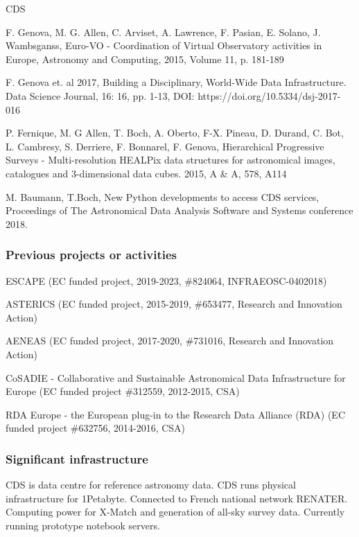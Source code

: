 \begin{sitedescription}{CDS}
\begin{compactenum}
  \item F. Genova, M. G. Allen, C. Arviset, A. Lawrence, F. Pasian, E. Solano, J. Wambsganss, Euro-VO - Coordination of Virtual Observatory activities in Europe, Astronomy and Computing, 2015, Volume 11, p. 181-189
  \item F. Genova et. al 2017, Building a Disciplinary, World-Wide Data Infrastructure. Data Science Journal, 16: 16, pp. 1-13, DOI: https://doi.org/10.5334/dsj-2017-016
  \item P. Fernique, M. G Allen, T. Boch, A. Oberto, F-X. Pineau, D. Durand, C. Bot, L. Cambresy, S. Derriere, F. Bonnarel, F. Genova, Hierarchical Progressive Surveys - Multi-resolution HEALPix data structures for astronomical images, catalogues and 3-dimensional data cubes.  2015, A \& A, 578, A114 
  \item M. Baumann, T.Boch, New Python developments to access CDS services, Proceedings of The Astronomical Data Analysis Software and Systems conference 2018.
\end{compactenum}

\subsubsection*{Previous projects or activities}

\begin{compactenum}
  \item ESCAPE (EC funded project, 2019-2023, \#824064, INFRAEOSC-0402018)
  \item ASTERICS (EC funded project, 2015-2019, \#653477, Research and Innovation Action)
  \item AENEAS (EC funded project,  2017-2020, \#731016, Research and Innovation Action)
  \item CoSADIE - Collaborative and Sustainable Astronomical Data Infrastructure for Europe (EC funded project \#312559, 2012-2015, CSA)
  \item RDA Europe - the European plug-in to the Research Data Alliance (RDA) (EC funded project \#632756, 2014-2016, CSA)
\end{compactenum}

\subsubsection*{Significant infrastructure}

CDS is data centre for reference astronomy data. CDS runs physical infrastructure for 1Petabyte. Connected to French national network RENATER. Computing power for X-Match and generation of all-sky survey data. Currently running prototype notebook servers.


\end{sitedescription}
